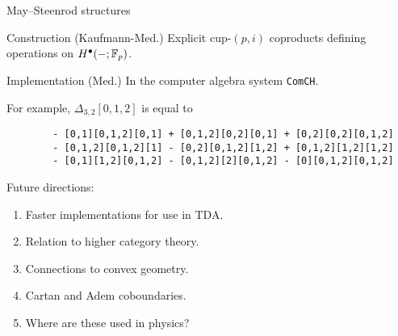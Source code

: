 \begin{frame}[fragile]{May--Steenrod structures}

	\vskip-5pt\pause

	\begin{block}{Construction (Kaufmann-Med.)}
		Explicit cup-$(p,i)$ coproducts defining \textcolor{pblue}{operations} on $H^\bullet(-; {\mathbb{F}_p})$.
	\end{block}

	\pause

	\begin{block}{Implementation (Med.)}
		In the computer algebra system \textcolor{pblue}{\texttt{ComCH}}.
	\end{block}

	\pause

	For example, $\Delta_{3,2}[0,1,2]$ is equal to

	\begin{verbatim}
		- [0,1][0,1,2][0,1] + [0,1,2][0,2][0,1] + [0,2][0,2][0,1,2]
		- [0,1,2][0,1,2][1] - [0,2][0,1,2][1,2] + [0,1,2][1,2][1,2]
		- [0,1][1,2][0,1,2] - [0,1,2][2][0,1,2] - [0][0,1,2][0,1,2]
	\end{verbatim}

	\pause

	\textcolor{pblue}{Future directions:}

	\pause
	\begin{enumerate}
		\item Faster implementations for use in TDA. \pause \\
		\item Relation to higher category theory. \pause \\
		\item Connections to convex geometry. \pause \\
		\item Cartan and Adem coboundaries. \pause \\
		\item Where are these used in physics?
	\end{enumerate}
\end{frame}